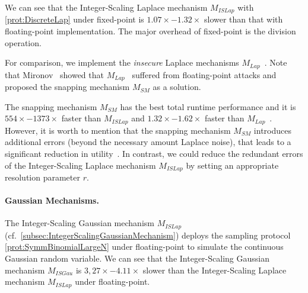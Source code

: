 We can see that the Integer-Scaling Laplace mechanism $M_{ISLap}$ with \autoref{prot:DiscreteLap} under \booleanGMW fixed-point is $1.07\times-1.32\times$ slower than that with \booleanGMW floating-point implementation.
The major overhead of \booleanGMW fixed-point is the division operation.

For comparison, we implement the \textit{insecure} Laplace mechanisms $M_{Lap}$~\cite{eigner2014differentially}.
Note that Mironov~\cite{mironov2012significance} showed that $M_{Lap}$~\cite{eigner2014differentially} suffered from floating-point attacks and proposed the snapping mechanism $M_{SM}$ as a solution.

The snapping mechanism $M_{SM}$ has the best total runtime performance and it is $554\times-1373\times $ faster than $M_{ISLap}$ and $1.32\times- 1.62\times$ faster than $M_{Lap}$~\cite{eigner2014differentially}.
However, it is worth to mention that the snapping mechanism $M_{SM}$ introduces additional errors (beyond the necessary amount Laplace noise), that leads to a significant reduction in utility~\cite{Covington2019,googleDP2019}.
In contrast, we could reduce the redundant errors of the Integer-Scaling Laplace mechanism $M_{ISLap}$ by setting an appropriate resolution parameter $r$.




\paragraph{Gaussian Mechanisms.}
The Integer-Scaling Gaussian mechanism $M_{ISLap}$ (cf.~\autoref{subsec:IntegerScalingGaussianMechanism}) deploys the sampling protocol \autoref{prot:SymmBinomialLargeN} under \booleanGMW floating-point to simulate the continuous Gaussian random variable.
We can see that the Integer-Scaling Gaussian mechanism $M_{ISGau}$ is $3,27\times-4.11\times$ slower than the Integer-Scaling Laplace mechanism $M_{ISLap}$ under \booleanGMW floating-point.

